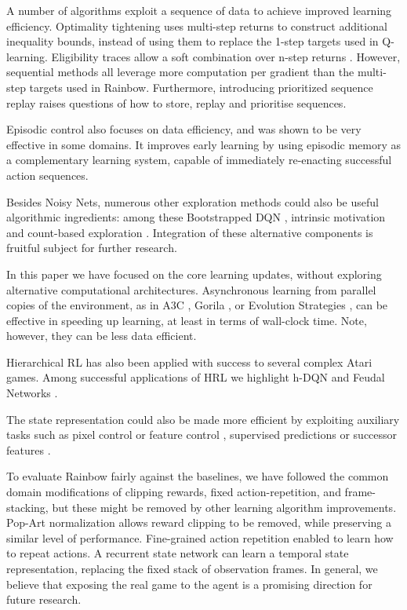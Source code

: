 \documentclass[letterpaper]{article} %
\begin{document}
A number of algorithms exploit a sequence of data to achieve improved learning efficiency. Optimality tightening \cite{HeLSP16} uses multi-step returns to construct additional inequality bounds, instead of using them to replace the 1-step targets used in Q-learning. Eligibility traces allow a soft combination over n-step returns \cite{Sutton:1988}. However, sequential methods all leverage more computation per gradient than the multi-step targets used in Rainbow. Furthermore, introducing prioritized sequence replay raises questions of how to store, replay and prioritise sequences. 

Episodic control \cite{Episodic} also focuses on data efficiency, and was shown to be very effective in some domains. It improves early learning by using episodic memory as a complementary learning system, capable of immediately re-enacting successful action sequences.

Besides Noisy Nets, numerous other exploration methods could also be useful algorithmic ingredients: among these Bootstrapped DQN \cite{Osband2016DeepEV}, intrinsic motivation \cite{StadieLA15} and count-based exploration \cite{Bellemare2016UnifyingCE}. Integration of these alternative components is fruitful subject for further research.

In this paper we have focused on the core learning updates, without exploring alternative computational architectures. Asynchronous learning from parallel copies of the environment, as in A3C \cite{Mnih:2016}, Gorila \cite{Nair2015}, or Evolution Strategies \cite{nes_atari}, can be effective in speeding up learning, at least in terms of wall-clock time. Note, however, they can be less data efficient.

Hierarchical RL has also been applied with success to several complex Atari games. Among successful applications of HRL we highlight h-DQN \cite{hDQN} and Feudal Networks \cite{Feudal}.

The state representation could also be made more efficient by exploiting auxiliary tasks such as pixel control or feature control \cite{JaderbergMCSLSK16}, supervised predictions \cite{DosovitskiyK16} or successor features \cite{kulkarni2016deep}.

To evaluate Rainbow fairly against the baselines, we have followed the common domain modifications of clipping rewards, fixed action-repetition, and frame-stacking, but these might be removed by other learning algorithm improvements. Pop-Art normalization \cite{PopNIPS} allows reward clipping to be removed, while preserving a similar level of performance. Fine-grained action repetition \cite{sharma2017learning} enabled to learn how to repeat actions. A recurrent state network \cite{hausknecht2015deep} can learn a temporal state representation, replacing the fixed stack of observation frames. In general, we believe that exposing the real game to the agent is a promising direction for future research.
\end{document}

